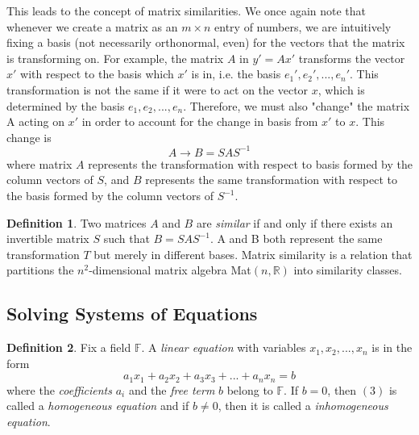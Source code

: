 \documentclass{article}
\theoremstyle{remark}
\theoremstyle{definition}
\newtheorem{definition}{Definition}[section]
\begin{document}
This leads to the concept of matrix similarities. We once again note that whenever we create a matrix as an $m \times n$ entry of numbers, we are intuitively fixing a basis (not necessarily orthonormal, even) for the vectors that the matrix is transforming on. For example, the matrix $A$ in $y' = Ax'$ transforms the vector $x'$ with respect to the basis which $x'$ is in, i.e. the basis ${e_1', e_2', ..., e_n'}$. This transformation is not the same if it were to act on the vector $x$, which is determined by the basis ${e_1, e_2, ..., e_n}$. Therefore, we must also "change" the matrix A acting on $x'$ in order to account for the change in basis from $x'$ to $x$. This change is 
\[A \rightarrow B = S A S^{-1}\]
where matrix $A$ represents the transformation with respect to basis formed by the column vectors of $S$, and $B$ represents the same transformation with respect to the basis formed by the column vectors of $S^{-1}$. 

\begin{definition}
Two matrices $A$ and $B$ are \textit{similar} if and only if there exists an invertible matrix $S$ such that $B = S A S^{-1}$. A and B both represent the same transformation $T$ but merely in different bases. Matrix similarity is a relation that partitions the $n^2$-dimensional matrix algebra Mat$(n, \mathbb{R})$ into similarity classes. 
\end{definition}

\subsection{Solving Systems of Equations}
\begin{definition}
Fix a field $\mathbb{F}$. A \textit{linear equation} with variables $x_1, x_2, ..., x_n$ is in the form 
\begin{equation}
    a_1 x_1 + a_2 x_2 + a_3 x_3 + ... + a_n x_n = b
\end{equation}
where the \textit{coefficients} $a_i$ and the \textit{free term} $b$ belong to $\mathbb{F}$. If $b = 0$, then $(3)$ is called a \textit{homogeneous equation} and if $b \neq 0$, then it is called a \textit{inhomogeneous equation}. 
\end{definition}
\end{document}
